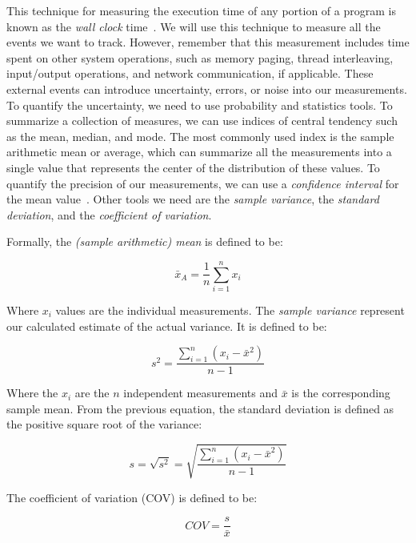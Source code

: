 This technique for measuring the execution time of any portion of a program
is known as the \emph{wall clock} time~\cite{lilja2005measuring}. We will use this technique to measure all the events we want to track. However, remember that this measurement includes time spent on other system operations, such as memory paging, thread interleaving, input/output operations, and network communication, if applicable. These external events can introduce uncertainty, errors, or noise into our measurements. To quantify the uncertainty, we need to use probability and statistics tools. To summarize a collection of measures, we can use indices of central tendency such as the mean, median, and mode. The most commonly used index is the sample arithmetic mean or average, which can summarize all the measurements into a single value that represents the center of the distribution of these values.  To quantify the precision of our measurements, we can use a \emph{confidence interval} for the mean value~\cite{DBLP_conf_oopsla_GeorgesBE07, lilja2005measuring}. Other tools we need are the \emph{sample variance}, the \emph{standard deviation}, and the \emph{coefficient of variation}.

Formally, the \emph{(sample arithmetic) mean} is defined to be:

\begin{equation}
\bar{x}_A = \frac{1}{n}\sum^n_{i = 1}x_i
\end{equation}

Where \(x_i\) values are the individual measurements. The \emph{sample variance}
represent our calculated estimate of the actual variance. It is defined to be:

\begin{equation}
s^2 = \frac{\sum_{i = 1}^n(x_i - \bar{x}^2)}{n - 1}
\end{equation}

Where the \(x_i\) are the \(n\) independent measurements and \(\bar{x}\) is
the corresponding sample mean. From the previous equation, the standard
deviation is defined as the positive square root of the variance:

\begin{equation}
s = \sqrt{s^2} = \sqrt{\frac{\sum_{i = 1}^n(x_i - \bar{x}^2)}{n - 1}}
\end{equation}

The coefficient of variation (COV) is defined to be:

\begin{equation}
  COV = \frac{s}{\bar{x}}
\end{equation}

